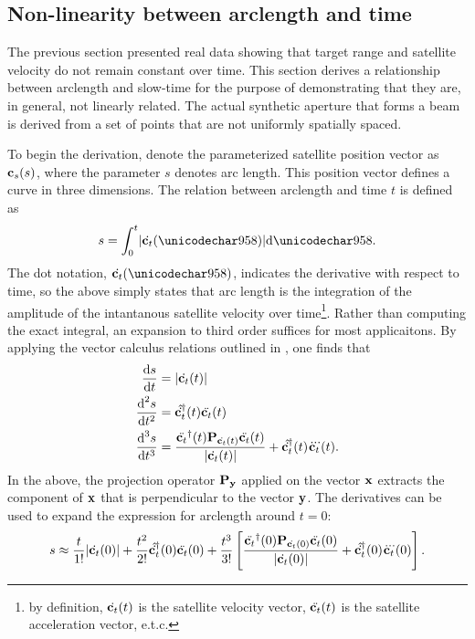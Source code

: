 \subsection{Non-linearity between arclength and time}
The previous section presented real data showing that target range and satellite velocity do not remain constant over time. This section derives a relationship between arclength and slow-time for the purpose of demonstrating that they are, in general, not linearly related. The actual synthetic aperture that forms a beam is derived from a set of points that are not uniformly spatially spaced.
\par
To begin the derivation, denote the parameterized satellite position vector as $\mathbf{c}_s(s)$, where the parameter $s$ denotes arc length. This position vector defines a curve in three dimensions. The relation between arclength and time $t$ is defined as
\begin{equation}
 s=\int_0^t\lvert\dot{\satt}(\xi)\rvert\d{\xi}.
\end{equation}
The dot notation, $\dot{\satt}(\xi)$, indicates the derivative with respect to time, so the above simply states that arc length is the integration of the amplitude of the intantanous satellite velocity over time\footnote{by definition, $\dot{\mathbf{c}_t}(t)$ is the satellite velocity vector, $\ddot{\mathbf{c}_t}(t)$ is the satellite acceleration vector, e.t.c.}. Rather than computing the exact integral, an expansion to third order suffices for most applicaitons. By applying the vector calculus relations outlined in , one finds that
\begin{align}
 \dtv{s}{t} &= \lvert\dot{\satt}(t)\rvert\\
 \dtvtwo{s}{t} &= \htr{\hat{\dot{\satt}}}(t)\ddot{\satt}(t)\\
 \dtvthree{s}{t} &= \frac{\htr{\ddot{\satt}}(t)\mtx{P}_{\dot{\satt}(t)}\ddot{\satt}(t)}{\lvert\dot{\satt}(t)\rvert} + \htr{\hat{\dot{\satt}}}(t)\dddot{\satt}(t).
\end{align}
In the above, the projection operator $\mtx{P}_{\vct{y}}$ applied on the vector $\mathbf{x}$ extracts the component of $\mathbf{x}$ that is perpendicular to the vector $\mathbf{y}$. The derivatives can be used to
expand the expression for arclength around $t=0$:
\begin{equation}
 s \approx \frac{t}{1!}\lvert\dot{\satt}(0)\rvert + \frac{t^2}{2!}\htr{\hat{\dot{\satt}}}(0)\ddot{\satt}(0) + \frac{t^3}{3!}\left[\frac{\htr{\ddot{\satt}}(0)\mtx{P}_{\dot{\satt}(0)}\ddot{\satt}(0)}{\lvert\dot{\satt}(0)\rvert} + \htr{\hat{\dot{\satt}}}(0)\dddot{\satt}(0)\right].
\end{equation}
